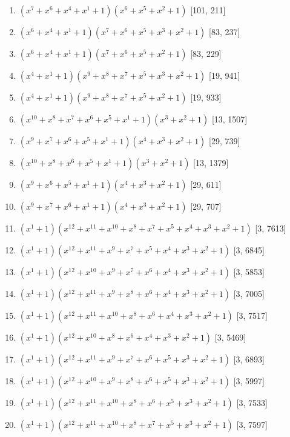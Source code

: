 \documentclass[10pt,twocolumn]{article}
\begin{document}
\begin{enumerate}
\item $(x^{7} + x^{6} + x^{4} + x^{1} + 1)(x^{6} + x^{5} + x^{2} + 1)$  [101, 211]
\item $(x^{6} + x^{4} + x^{1} + 1)(x^{7} + x^{6} + x^{5} + x^{3} + x^{2} + 1)$  [83, 237]
\item $(x^{6} + x^{4} + x^{1} + 1)(x^{7} + x^{6} + x^{5} + x^{2} + 1)$  [83, 229]
\item $(x^{4} + x^{1} + 1)(x^{9} + x^{8} + x^{7} + x^{5} + x^{3} + x^{2} + 1)$  [19, 941]
\item $(x^{4} + x^{1} + 1)(x^{9} + x^{8} + x^{7} + x^{5} + x^{2} + 1)$  [19, 933]
\item $(x^{10} + x^{8} + x^{7} + x^{6} + x^{5} + x^{1} + 1)(x^{3} + x^{2} + 1)$  [13, 1507]
\item $(x^{9} + x^{7} + x^{6} + x^{5} + x^{1} + 1)(x^{4} + x^{3} + x^{2} + 1)$  [29, 739]
\item $(x^{10} + x^{8} + x^{6} + x^{5} + x^{1} + 1)(x^{3} + x^{2} + 1)$  [13, 1379]
\item $(x^{9} + x^{6} + x^{5} + x^{1} + 1)(x^{4} + x^{3} + x^{2} + 1)$  [29, 611]
\item $(x^{9} + x^{7} + x^{6} + x^{1} + 1)(x^{4} + x^{3} + x^{2} + 1)$  [29, 707]
\item $(x^{1} + 1)(x^{12} + x^{11} + x^{10} + x^{8} + x^{7} + x^{5} + x^{4} + x^{3} + x^{2} + 1)$  [3, 7613]
\item $(x^{1} + 1)(x^{12} + x^{11} + x^{9} + x^{7} + x^{5} + x^{4} + x^{3} + x^{2} + 1)$  [3, 6845]
\item $(x^{1} + 1)(x^{12} + x^{10} + x^{9} + x^{7} + x^{6} + x^{4} + x^{3} + x^{2} + 1)$  [3, 5853]
\item $(x^{1} + 1)(x^{12} + x^{11} + x^{9} + x^{8} + x^{6} + x^{4} + x^{3} + x^{2} + 1)$  [3, 7005]
\item $(x^{1} + 1)(x^{12} + x^{11} + x^{10} + x^{8} + x^{6} + x^{4} + x^{3} + x^{2} + 1)$  [3, 7517]
\item $(x^{1} + 1)(x^{12} + x^{10} + x^{8} + x^{6} + x^{4} + x^{3} + x^{2} + 1)$  [3, 5469]
\item $(x^{1} + 1)(x^{12} + x^{11} + x^{9} + x^{7} + x^{6} + x^{5} + x^{3} + x^{2} + 1)$  [3, 6893]
\item $(x^{1} + 1)(x^{12} + x^{10} + x^{9} + x^{8} + x^{6} + x^{5} + x^{3} + x^{2} + 1)$  [3, 5997]
\item $(x^{1} + 1)(x^{12} + x^{11} + x^{10} + x^{8} + x^{6} + x^{5} + x^{3} + x^{2} + 1)$  [3, 7533]
\item $(x^{1} + 1)(x^{12} + x^{11} + x^{10} + x^{8} + x^{7} + x^{5} + x^{3} + x^{2} + 1)$  [3, 7597]

\end{enumerate}
\end{document}
